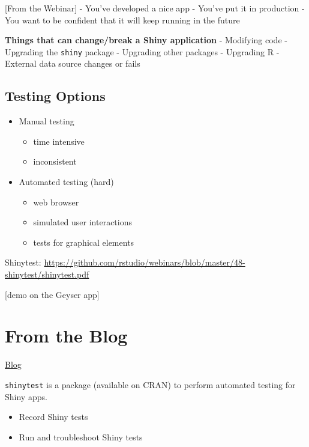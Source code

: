 \documentclass[]{book}
\providecommand{\tightlist}{%
  \setlength{\itemsep}{0pt}\setlength{\parskip}{0pt}}
\theoremstyle{definition}
\theoremstyle{definition}
\theoremstyle{definition}
\theoremstyle{remark}
\begin{document}
{[}From the Webinar{]} - You've developed a nice app - You've put it in
production - You want to be confident that it will keep running in the
future

\textbf{Things that can change/break a Shiny application} - Modifying
code - Upgrading the \texttt{shiny} package - Upgrading other packages -
Upgrading R - External data source changes or fails

\hypertarget{testing-options}{%
\subsection{Testing Options}\label{testing-options}}

\begin{itemize}
\tightlist
\item
  Manual testing

  \begin{itemize}
  \tightlist
  \item
    time intensive
  \item
    inconsistent
  \end{itemize}
\item
  Automated testing (hard)

  \begin{itemize}
  \tightlist
  \item
    web browser
  \item
    simulated user interactions
  \item
    tests for graphical elements
  \end{itemize}
\end{itemize}

Shinytest:
\url{https://github.com/rstudio/webinars/blob/master/48-shinytest/shinytest.pdf}

{[}demo on the Geyser app{]}

\hypertarget{from-the-blog}{%
\section{From the Blog}\label{from-the-blog}}

\href{https://resources.rstudio.com/rstudio-blog/shinytest-automated-testing-for-shiny-apps}{Blog}

\texttt{shinytest} is a package (available on CRAN) to perform automated
testing for Shiny apps.

\begin{itemize}
\tightlist
\item
  Record Shiny tests
\item
  Run and troubleshoot Shiny tests
\end{itemize}
\end{document}

